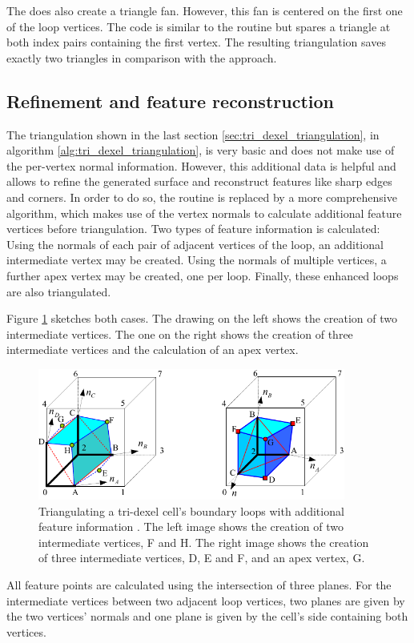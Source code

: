 The  does also create a triangle fan.
However, this fan is centered on the first one of the loop vertices.
The code is similar to the  routine but spares a triangle at both index pairs containing the first vertex.
The resulting triangulation saves exactly two triangles in comparison with the  approach.


\subsection{Refinement and feature reconstruction}
\label{sec:tri_dexel_refinement}

The triangulation shown in the last section \ref{sec:tri_dexel_triangulation},  in algorithm \ref{alg:tri_dexel_triangulation}, is very basic and does not make use of the per-vertex normal information.
However, this additional data is helpful and allows to refine the generated surface and reconstruct features like sharp edges and corners.
In order to do so, the  routine is replaced by a more comprehensive algorithm, which makes use of the vertex normals to calculate additional feature vertices before triangulation.
Two types of feature information is calculated:
Using the normals of each pair of adjacent vertices of the loop, an additional intermediate vertex may be created.
Using the normals of multiple vertices, a further apex vertex may be created, one per loop.
Finally, these enhanced loops are also triangulated.

Figure \ref{fig:tri_dexel_refinement} sketches both cases.
The drawing on the left shows the creation of two intermediate vertices.
The one on the right shows the creation of three intermediate vertices and the calculation of an apex vertex.
%
\begin{figure}
	\centering
	\includegraphics[width=0.9\textwidth]{images/tri_dexel_refinement}
	\caption{
		Triangulating a tri-dexel cell's boundary loops with additional feature information \cite{tridexel_reconstruction}.
		The left image shows the creation of two intermediate vertices, F and H.
		The right image shows the creation of three intermediate vertices, D, E and F, and an apex vertex, G.
	}
	\label{fig:tri_dexel_refinement}
\end{figure}
%
All feature points are calculated using the intersection of three planes.
For the intermediate vertices between two adjacent loop vertices, two planes are given by the two vertices' normals and one plane is given by the cell's side containing both vertices.

